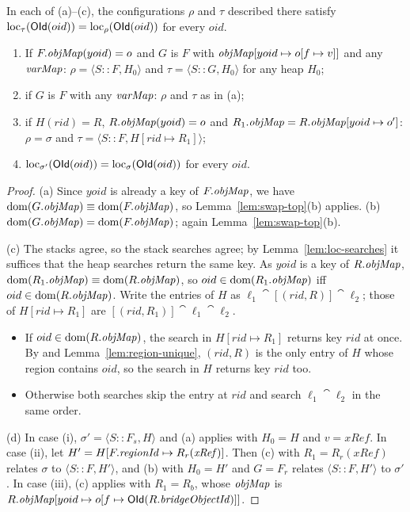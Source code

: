 \begin{lemma}
\label{lem:swap-loc}
In each of (a)--(c), the configurations $\rho$ and $\tau$ described there satisfy
$\mathrm{loc}_{\tau}(\mathsf{OId}(oid)) = \mathrm{loc}_{\rho}(\mathsf{OId}(oid))$ for every $oid$.
\begin{enumerate}[nosep,label=(\alph*)]
  \item If $F.\mathit{objMap}(yoid) = o$ and $G$ is $F$ with $\mathit{objMap}[yoid \mapsto o[f \mapsto v]]$ and any
    $\mathit{varMap}$: $\rho = \langle S :: F, H_0\rangle$ and $\tau = \langle S :: G, H_0\rangle$ for any heap
    $H_0$; 
  \item if $G$ is $F$ with any $\mathit{varMap}$: $\rho$ and $\tau$ as in (a);
  \item if $H(rid) = R$, $R.\mathit{objMap}(yoid) = o$ and $R_1.\mathit{objMap} = R.\mathit{objMap}[yoid \mapsto o']$:
    $\rho = \sigma$ and $\tau = \langle S :: F, H[rid \mapsto R_1]\rangle$;
  \item $\mathrm{loc}_{\sigma'}(\mathsf{OId}(oid)) = \mathrm{loc}_{\sigma}(\mathsf{OId}(oid))$ for every $oid$.
\end{enumerate}
\end{lemma}
\begin{proof}
(a) Since $yoid$ is already a key of $F.\mathit{objMap}$, we have $\mathrm{dom}(G.\mathit{objMap}) \equiv \mathrm{dom}(F.\mathit{objMap})$, so
Lemma~\ref{lem:swap-top}(b) applies. (b) $\mathrm{dom}(G.\mathit{objMap}) = \mathrm{dom}(F.\mathit{objMap})$; again
Lemma~\ref{lem:swap-top}(b).

(c) The stacks agree, so the stack searches agree; by Lemma~\ref{lem:loc-searches} it suffices that
the heap searches return the same key. As $yoid$ is a key of $R.\mathit{objMap}$,
$\mathrm{dom}(R_1.\mathit{objMap}) \equiv \mathrm{dom}(R.\mathit{objMap})$, so $oid \in \mathrm{dom}(R_1.\mathit{objMap})$ iff $oid \in \mathrm{dom}(R.\mathit{objMap})$. Write
the entries of $H$ as $\ell_1 \cat [(rid, R)] \cat \ell_2$; those of $H[rid \mapsto R_1]$ are
$[(rid, R_1)] \cat \ell_1 \cat \ell_2$.
\begin{itemize}[nosep]
  \item If $oid \in \mathrm{dom}(R.\mathit{objMap})$, the search in $H[rid \mapsto R_1]$ returns key $rid$ at once. By
     and Lemma~\ref{lem:region-unique}, $(rid, R)$ is the only entry of $H$ whose region
    contains $oid$, so the search in $H$ returns key $rid$ too.
  \item Otherwise both searches skip the entry at $rid$ and search $\ell_1 \cat \ell_2$ in the same
    order.
\end{itemize}

(d) In case (i), $\sigma' = \langle S :: F_s, H\rangle$ and (a) applies with $H_0 = H$ and
$v = \mathit{xRef}$. In case (ii), let $H' = H[F.\mathit{regionId} \mapsto R_r(\mathit{xRef})]$. Then (c) with
$R_1 = R_r(\mathit{xRef})$ relates $\sigma$ to $\langle S :: F, H'\rangle$, and (b) with $H_0 = H'$
and $G = F_r$ relates $\langle S :: F, H'\rangle$ to $\sigma'$. In case (iii), (c) applies with
$R_1 = R_b$, whose $\mathit{objMap}$ is $R.\mathit{objMap}[yoid \mapsto o[f \mapsto \mathsf{OId}(R.\mathit{bridgeObjectId})]]$.
\end{proof}

